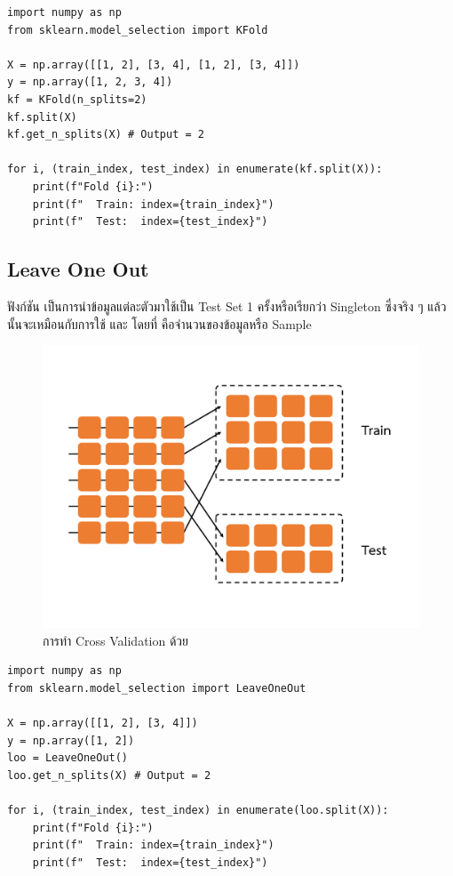 \begin{lstlisting}[style=MyPython]
import numpy as np
from sklearn.model_selection import KFold

X = np.array([[1, 2], [3, 4], [1, 2], [3, 4]])
y = np.array([1, 2, 3, 4])
kf = KFold(n_splits=2)
kf.split(X)
kf.get_n_splits(X) # Output = 2

for i, (train_index, test_index) in enumerate(kf.split(X)):
    print(f"Fold {i}:")
    print(f"  Train: index={train_index}")
    print(f"  Test:  index={test_index}")
\end{lstlisting}

\subsection{Leave One Out}
\label{ssec:leave_one_out}

ฟังก์ชัน  เป็นการนำข้อมูลแต่ละตัวมาใช้เป็น Test Set 1 ครั้งหรือเรียกว่า Singleton ซึ่งจริง ๆ แล้ว 
 นั้นจะเหมือนกับการใช้  และ  โดยที่ 
 คือจำนวนของข้อมูลหรือ Sample

\begin{figure}[H]
    \centering
    \includegraphics[width=0.9\linewidth,page=5]{fig/cross_validation.pdf}
    \caption{การทำ Cross Validation ด้วย }
    \label{fig:leave_one_out}
\end{figure}

\begin{lstlisting}[style=MyPython]
import numpy as np
from sklearn.model_selection import LeaveOneOut

X = np.array([[1, 2], [3, 4]])
y = np.array([1, 2])
loo = LeaveOneOut()
loo.get_n_splits(X) # Output = 2 

for i, (train_index, test_index) in enumerate(loo.split(X)):
    print(f"Fold {i}:")
    print(f"  Train: index={train_index}")
    print(f"  Test:  index={test_index}")
\end{lstlisting}

